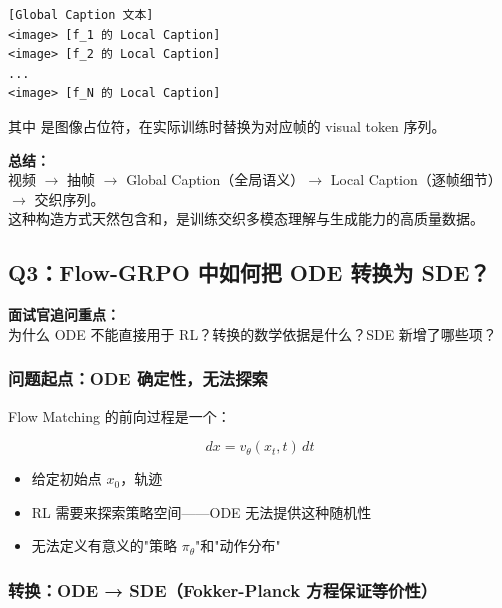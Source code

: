 \begin{lstlisting}
[Global Caption 文本]
<image> [f_1 的 Local Caption]
<image> [f_2 的 Local Caption]
...
<image> [f_N 的 Local Caption]
\end{lstlisting}

其中  是图像占位符，在实际训练时替换为对应帧的 visual token 序列。

\begin{summarybox}
\textbf{总结：}\\
视频 $\to$ 抽帧 $\to$ Global Caption（全局语义）$\to$ Local Caption（逐帧细节）$\to$ 交织序列。\\
这种构造方式天然包含和，是训练交织多模态理解与生成能力的高质量数据。
\end{summarybox}

\subsection{Q3：Flow-GRPO 中如何把 ODE 转换为 SDE？}

\begin{warnbox}
\textbf{面试官追问重点：}\\
为什么 ODE 不能直接用于 RL？转换的数学依据是什么？SDE 新增了哪些项？
\end{warnbox}

\subsubsection{问题起点：ODE 确定性，无法探索}

Flow Matching 的前向过程是一个：

\[
dx = v_\theta(x_t, t)\, dt
\]

\begin{itemize}[leftmargin=1.5em]
  \item 给定初始点 $x_0$，轨迹
  \item RL 需要来探索策略空间——ODE 无法提供这种随机性
  \item 无法定义有意义的"策略 $\pi_\theta$"和"动作分布"
\end{itemize}

\subsubsection{转换：ODE → SDE（Fokker-Planck 方程保证等价性）}

